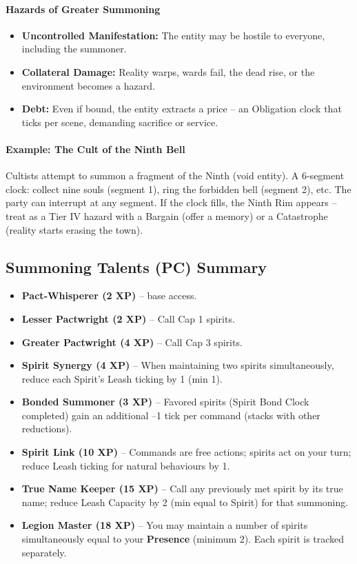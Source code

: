 \paragraph{Hazards of Greater Summoning}
\begin{itemize}
  \item \textbf{Uncontrolled Manifestation:} The entity may be hostile to everyone, including the summoner.
  \item \textbf{Collateral Damage:} Reality warps, wards fail, the dead rise, or the environment becomes a hazard.
  \item \textbf{Debt:} Even if bound, the entity extracts a price -- an Obligation clock that ticks per scene, demanding sacrifice or service.
\end{itemize}

\paragraph{Example: The Cult of the Ninth Bell}
Cultists attempt to summon a fragment of the Ninth (void entity). A 6‑segment clock: collect nine souls (segment 1), ring the forbidden bell (segment 2), etc. The party can interrupt at any segment. If the clock fills, the Ninth Rim appears -- treat as a Tier IV hazard with a Bargain (offer a memory) or a Catastrophe (reality starts erasing the town).

\subsection{Summoning Talents (PC) Summary}
\label{sec:summoning-talents}
\begin{itemize}
  \item \textbf{Pact‑Whisperer (2 XP)} -- base access.
  \item \textbf{Lesser Pactwright (2 XP)} -- Call Cap 1 spirits.
  \item \textbf{Greater Pactwright (4 XP)} -- Call Cap 3 spirits.
  \item \textbf{Spirit Synergy (4 XP)} -- When maintaining two spirits simultaneously, reduce each Spirit's Leash ticking by 1 (min 1).
  \item \textbf{Bonded Summoner (3 XP)} -- Favored spirits (Spirit Bond Clock completed) gain an additional –1 tick per command (stacks with other reductions).
  \item \textbf{Spirit Link (10 XP)} -- Commands are free actions; spirits act on your turn; reduce Leash ticking for natural behaviours by 1.
  \item \textbf{True Name Keeper (15 XP)} -- Call any previously met spirit by its true name; reduce Leash Capacity by 2 (min equal to Spirit) for that summoning.
  \item \textbf{Legion Master (18 XP)} -- You may maintain a number of spirits simultaneously equal to your \textbf{Presence} (minimum 2). Each spirit is tracked separately.
\end{itemize}